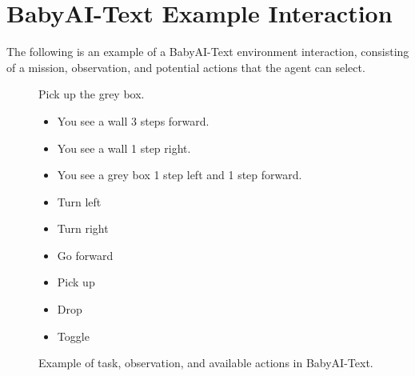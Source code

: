 \documentclass[11pt,a4paper]{article}
\begin{document}
\newpage
\onecolumn
\appendix

\section{BabyAI-Text Example Interaction}
\label{appendix: babyai-text}
The following is an example of a BabyAI-Text environment interaction, consisting of a mission, observation, and potential actions that the agent can select.
\begin{figure}[ht]
    \centering
    \begin{tcolorbox}[enhanced, title=BabyAI-Text Interaction Example, 
                      colback=white, colframe=gray!60!black, 
                      width=0.5\textwidth, boxrule=1pt,
                      arc=3mm, auto outer arc,
                      fonttitle=\bfseries\sffamily\color{white}]
    
    \begin{tcolorbox}[colback=blue!3, colframe=blue!30!gray, 
                      title=\textbf{Task}, fonttitle=\bfseries,
                      arc=2mm, boxrule=0.8pt]
    Pick up the grey box.
    \end{tcolorbox}
    
    \vspace{0.5em}
    \begin{tcolorbox}[colback=teal!3, colframe=teal!30!gray, 
                      title=\textbf{Observation}, fonttitle=\bfseries,
                      arc=2mm, boxrule=0.8pt]
    \begin{itemize}[leftmargin=*, nosep]
        \item You see a wall 3 steps forward.
        \item You see a wall 1 step right.
        \item You see a grey box 1 step left and 1 step forward.
    \end{itemize}
    \end{tcolorbox}
    
    \vspace{0.5em}
    \begin{tcolorbox}[colback=violet!3, colframe=violet!30!gray, 
                      title=\textbf{Actions}, fonttitle=\bfseries,
                      arc=2mm, boxrule=0.8pt]
    \begin{multicols}{2}
    \small
    \begin{itemize}[leftmargin=*, nosep]
        \item Turn left
        \item Turn right
        \item Go forward
        \item Pick up
        \item Drop
        \item Toggle
    \end{itemize}
    \end{multicols}
    \end{tcolorbox}
    
    \end{tcolorbox}
    \caption{Example of task, observation, and available actions in BabyAI-Text.}
    \label{fig:babyai-example}
\end{figure}
\end{document}
